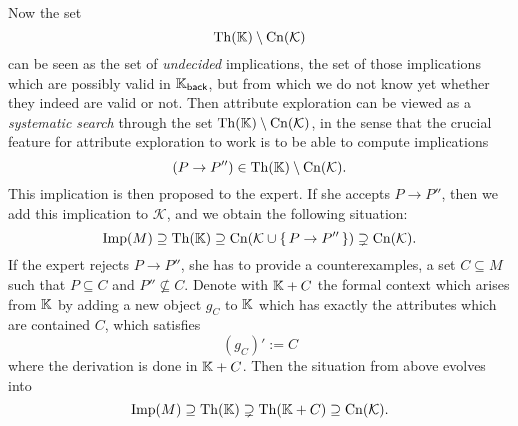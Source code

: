 Now the set
\begin{equation*}
  \operatorname{Th}({\mathbb{K}}) \setminus \operatorname{Cn}(\mathcal{K})
\end{equation*}
can be seen as the set of \emph{undecided} implications, \ie the set of those implications
which are possibly valid in ${\mathbb{K}}_{\mathsf{back}}$, but from which we do not know yet
whether they indeed are valid or not.  Then attribute exploration can be viewed as a
\emph{systematic search} through the set $\operatorname{Th}({\mathbb{K}}) \setminus \operatorname{Cn}(\mathcal{K})$, in the
sense that the crucial feature for attribute exploration to work is to be able to compute
implications
\begin{equation}
  \label{eq:33}
  (P \to P'') \in \operatorname{Th}({\mathbb{K}}) \setminus \operatorname{Cn}(\mathcal{K}).
\end{equation}
This implication is then proposed to the expert.  If she accepts $P \to P''$, then we add
this implication to $\mathcal{K}$, and we obtain the following situation:
\begin{equation*}
  \operatorname{Imp}(M) \supseteq \operatorname{Th}({\mathbb{K}}) \supseteq \operatorname{Cn}(\mathcal{K} \cup {\ensuremath{\{\, P \to P'' \,\}}})
  \supsetneq \operatorname{Cn}(\mathcal{K}).
\end{equation*}
If the expert rejects $P \to P''$, she has to provide a counterexamples, \ie a set $C
\subseteq M$ such that $P \subseteq C$ and $P'' \not\subseteq C$.  Denote with ${\mathbb{K}} +
C$ the formal context which arises from ${\mathbb{K}}$ by adding a new object $g_C$ to ${\mathbb{K}}$
which has exactly the attributes which are contained $C$, \ie which satisfies
\begin{equation*}
  (g_C)' := C
\end{equation*}
where the derivation is done in ${\mathbb{K}} + C$.  Then the situation from above evolves into
\begin{equation*}
  \operatorname{Imp}(M) \supseteq \operatorname{Th}({\mathbb{K}}) \supsetneq \operatorname{Th}({\mathbb{K}} + C) \supseteq \operatorname{Cn}(\mathcal{K}).
\end{equation*}

